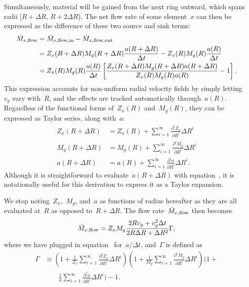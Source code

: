 \documentclass[main.tex]{subfiles}
\begin{document}
Simultaneously, material will be gained from the next ring outward, which spans
radii [$R + \Delta R$, $R + 2\Delta R$).
The net flow rate of some element~$x$ can then be expressed as the difference
of these two source and sink terms:
\begin{equation}\begin{split}
\dot{M}_{x,\text{flow}} &= \dot{M}_{x,\text{flow},\text{in}} -
\dot{M}_{x,\text{flow},\text{out}}
\\
&= Z_x(R + \Delta R) M_g(R + \Delta R) \frac{a(R + \Delta R)}{\Delta t} -
Z_x(R) M_g(R) \frac{a(R)}{\Delta t}
\\
&= Z_x(R) M_g(R) \frac{a(R)}{\Delta t}
\left[
\frac{Z_x(R + \Delta R) M_g(R + \Delta R) a(R + \Delta R)}{Z_x(R) M_g(R) a(R)}
- 1\right].
\label{outflows:eq:flowin-minus-flowout}
\end{split}\end{equation}
This expression accounts for non-uniform radial velocity fields by simply
letting~$v_g$ vary with~$R$, and the effects are tracked automatically
through~$a(R)$.
Regardless of the functional forms of~$Z_x(R)$ and~$M_g(R)$, they can be
expressed as Taylor series, along with~$a$:
\begin{subequations}\begin{align}
Z_x(R + \Delta R) &= Z_x(R) + \sum_{i = 1}^\infty
\frac{\partial^i Z_x}{\partial R^i} \Delta R^i
\\
M_g(R + \Delta R) &= M_g(R) + \sum_{i = 1}^\infty
\frac{\partial^i M_g}{\partial R^i} \Delta R^i
\\
a(R + \Delta R) &= a(R) + \sum_{i = 1}^\infty
\frac{\partial^i a}{\partial R^i} \Delta R^i.
\end{align}\end{subequations}
Although it is straightforward to evaluate~$a(R + \Delta R)$ with
equation~, it is notationally useful for this
derivation to express it as a Taylor expansion.
\par
We stop noting~$Z_x$,~$M_g$, and~$a$ as functions of radius hereafter as they
are all evaluated at~$R$ as opposed to~$R + \Delta R$.
The flow rate~$\dot{M}_{x,\text{flow}}$ then becomes
\begin{equation}
\dot{M}_{x,\text{flow}} = Z_x M_g
\frac{2 R v_g + v_g^2 \Delta t}{2 R \Delta R + \Delta R^2} \Gamma,
\end{equation}
where we have plugged in equation~
for~$a / \Delta t$, and~$\Gamma$ is defined as
\begin{equation}\begin{split}
\Gamma &\equiv
\left(1 + \frac{1}{Z_x}
\sum_{i = 1}^\infty \frac{\partial^i Z_x}{\partial R^i} \Delta R^i\right)
\left(1 + \frac{1}{M_g}
\sum_{i = 1}^\infty \frac{\partial^i M_g}{\partial R^i} \Delta R^i\right)
\Bigg(1 +
\\
&\qquad
\frac{1}{a}
\sum_{i = 1}^\infty \frac{\partial^i a}{\partial R^i} \Delta R^i\Bigg) - 1.
\end{split}\end{equation}
\end{document}
